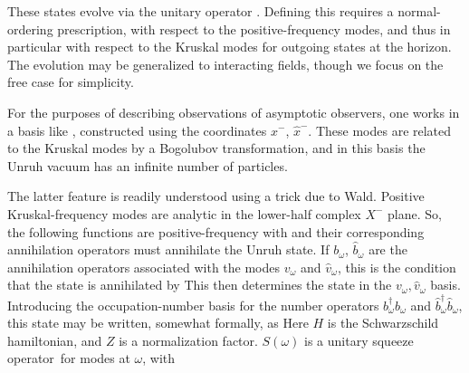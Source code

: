 These states evolve via the unitary operator \unitop.   Defining this requires a normal-ordering prescription, with respect to the positive-frequency modes, and thus in particular with respect to the Kruskal modes for outgoing states at the horizon.  The evolution may be generalized to interacting fields, though we focus on the free case for simplicity. 


For the purposes of describing observations of asymptotic observers, one works in a basis like \vki, constructed using the coordinates $x^-$, ${\hat x}^-$.  These modes are related to the Kruskal modes by a Bogolubov transformation, and in this basis the Unruh vacuum has an infinite number of particles.

The latter  feature is readily understood using a trick due to Wald.  Positive Kruskal-frequency modes are analytic in the lower-half complex $X^-$ plane.  So, the following functions are positive-frequency
%
\eqn{}
%
with
%
\eqn{}
%
and their corresponding annihilation operators must annihilate the Unruh state. If $b_\omega$, ${\hat b}_\omega$ are the annihilation operators associated with the modes $v_\omega$ and ${\hat v}_\omega$, this is the condition that the state is annihilated by
%
\eqn{}
%
This then determines the state in the $v_\omega,{\hat v}_\omega$ basis.  Introducing the occupation-number basis for the number operators $b_\omega^\dagger b_\omega$ and ${\hat b}_\omega^\dagger {\hat b}_\omega$, 
this state may be written, somewhat formally, as
%
\eqn{}
%
Here $H$ is the Schwarzschild hamiltonian,
%
\eqn{}
% 
and
$Z$ is a normalization factor.  $S(\omega)$ is a unitary squeeze operator\CavesZZ\ for modes at $\omega$, 
%
\eqn{}
%
with
%
\eqn{}



